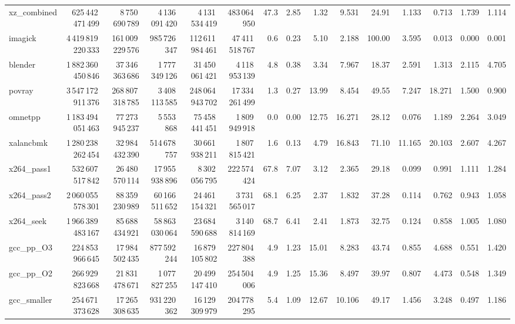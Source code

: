 \documentclass[9pt,landscape,a4paper]{article}
\begin{document}
\begin{adjustbox}{max width=\textwidth, max totalheight=0.50\textheight}
\begin{tabular}{lrrrrrrrrrrrrrr}
xz\_combined & 625\,442\,471\,499 & 8\,750\,690\,789 & 4\,136\,091\,420 & 4\,131\,534\,419 & 483\,064\,950 & 47.3 & 2.85 & 1.32 & 9.531 & 24.91 & 1.133 & 0.713 & 1.739 & 1.114 \\
imagick & 4\,419\,819\,220\,333 & 161\,009\,229\,576 & 985\,726\,347 & 112\,611\,984\,461 & 47\,411\,518\,767 & 0.6 & 0.23 & 5.10 & 2.188 & 100.00 & 3.595 & 0.013 & 0.000 & 0.001 \\
blender & 1\,882\,360\,450\,846 & 37\,346\,363\,686 & 1\,777\,349\,126 & 31\,450\,061\,421 & 4\,118\,953\,139 & 4.8 & 0.38 & 3.34 & 7.967 & 18.37 & 2.591 & 1.313 & 2.115 & 4.705 \\
povray & 3\,547\,172\,911\,376 & 268\,807\,318\,785 & 3\,408\,113\,585 & 248\,064\,943\,702 & 17\,334\,261\,499 & 1.3 & 0.27 & 13.99 & 8.454 & 49.55 & 7.247 & 18.271 & 1.500 & 0.900 \\
omnetpp & 1\,183\,494\,051\,463 & 77\,273\,945\,237 & 5\,553\,868 & 75\,458\,441\,451 & 1\,809\,949\,918 & 0.0 & 0.00 & 12.75 & 16.271 & 28.12 & 0.076 & 1.189 & 2.264 & 3.049 \\
xalancbmk & 1\,280\,238\,262\,454 & 32\,984\,432\,390 & 514\,678\,757 & 30\,661\,938\,211 & 1\,807\,815\,421 & 1.6 & 0.13 & 4.79 & 16.843 & 71.10 & 11.165 & 20.103 & 2.607 & 4.267 \\
x264\_pass1 & 532\,607\,517\,842 & 26\,480\,570\,114 & 17\,955\,938\,896 & 8\,302\,056\,795 & 222\,574\,424 & 67.8 & 7.07 & 3.12 & 2.365 & 29.18 & 0.099 & 0.991 & 1.111 & 1.284 \\
x264\_pass2 & 2\,060\,055\,578\,301 & 88\,359\,230\,989 & 60\,166\,511\,652 & 24\,461\,154\,321 & 3\,731\,565\,017 & 68.1 & 6.25 & 2.37 & 1.832 & 37.28 & 0.114 & 0.762 & 0.943 & 1.058 \\
x264\_seek & 1\,966\,389\,483\,167 & 85\,688\,434\,921 & 58\,863\,030\,064 & 23\,684\,590\,688 & 3\,140\,814\,169 & 68.7 & 6.41 & 2.41 & 1.873 & 32.75 & 0.124 & 0.858 & 1.005 & 1.080 \\
gcc\_pp\_O3 & 224\,853\,966\,645 & 17\,984\,502\,435 & 877\,592\,244 & 16\,879\,105\,802 & 227\,804\,388 & 4.9 & 1.23 & 15.01 & 8.283 & 43.74 & 0.855 & 4.688 & 0.551 & 1.420 \\
gcc\_pp\_O2 & 266\,929\,823\,668 & 21\,831\,478\,671 & 1\,077\,827\,255 & 20\,499\,147\,410 & 254\,504\,006 & 4.9 & 1.25 & 15.36 & 8.497 & 39.97 & 0.807 & 4.473 & 0.548 & 1.349 \\
gcc\_smaller & 254\,671\,373\,628 & 17\,265\,308\,635 & 931\,220\,362 & 16\,129\,309\,979 & 204\,778\,295 & 5.4 & 1.09 & 12.67 & 10.106 & 49.17 & 1.456 & 3.248 & 0.497 & 1.186 \\

\end{tabular}
\end{adjustbox}
\end{document}
